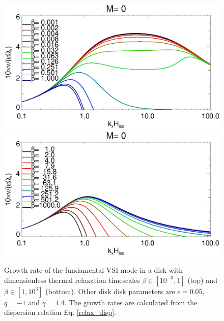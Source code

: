 \begin{figure}
  \includegraphics[width=\linewidth,clip=true,trim=0cm 1.75cm 0cm 0cm]{figures/rate_theory_grow_relax}
  \includegraphics[width=\linewidth,clip=true,trim=0cm 0cm 0cm 1cm]{figures/rate_theory_grow_relax2}
  \caption{Growth rate of the fundamental VSI mode in a disk with
    dimensionless thermal relaxation timescales
    $\beta\in[10^{-3},1]$ (top) and $\beta\in[1,10^3]$ (bottom).
Other disk disk parameters are
    $\epsilon=0.05$, $q=-1$ and $\gamma=1.4$. The growth rates are
    calculated from the dispersion relation Eq. \ref{relax_disp}. 
    \label{relax_disp_fig}}  
\end{figure}   


